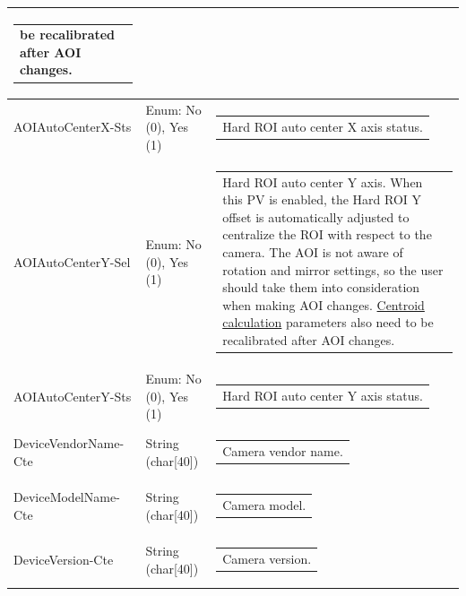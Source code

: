 \documentclass[openany]{article}
\begin{document}
\begin{longtable}{| m{3.0cm} m{4.5cm}  m{7.0cm} |}
\begin{tabular}{@{}m{6cm}@{}}
                be recalibrated after AOI changes.
            \end{tabular} \\ \hline
        AOIAutoCenterX-Sts & Enum: No (0), Yes (1) & \begin{tabular}{@{}m{6cm}@{}}
                Hard ROI auto center X axis status.
            \end{tabular} \hypertarget{pv:hard-roi-auto-center-y}{}\\ \hline
        AOIAutoCenterY-Sel & Enum: No (0), Yes (1) & \begin{tabular}{@{}m{6cm}@{}}
                Hard ROI auto center Y axis. When this PV is enabled, the Hard ROI Y offset 
                is automatically adjusted to centralize the ROI with respect to the camera.
                The AOI is not aware of rotation and mirror settings, so the user should
                take them into consideration when making AOI changes.
                \hyperref[sec:centroid-calc]{Centroid calculation} parameters also need to
                be recalibrated after AOI changes.
            \end{tabular} \\ \hline
        AOIAutoCenterY-Sts & Enum: No (0), Yes (1) & \begin{tabular}{@{}m{6cm}@{}}
                Hard ROI auto center Y axis status.
            \end{tabular} \hypertarget{pv:vendor-name}{}\\ \hline
        DeviceVendorName-Cte & String (char[40]) & \begin{tabular}{@{}m{6cm}@{}}
                Camera vendor name.
            \end{tabular} \hypertarget{pv:device-model}{}\\ \hline
        DeviceModelName-Cte & String (char[40]) & \begin{tabular}{@{}m{6cm}@{}}
                Camera model.
            \end{tabular} \hypertarget{pv:device-version}{}\\ \hline
        DeviceVersion-Cte & String (char[40]) & \begin{tabular}{@{}m{6cm}@{}}
                Camera version.
            \end{tabular} \hypertarget{pv:firmware-version}{}\\ \hline

\end{longtable}
\end{document}

